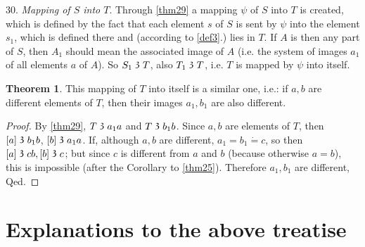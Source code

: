 \documentclass[leqno, hidelinks]{article}
\theoremstyle{definition}
\newtheorem{theorem}{Theorem}
\newcommand\partof{\mathrel{\raisebox{0.45ex}{$\mathfrak{3}$}}}
\begin{document}
30. \emph{Mapping of $S$ into $T$}. Through \ref{thm29} a mapping $\psi$ of $S$ into $T$ is created, which is defined by the fact that each element $s$ of $S$ is sent by $\psi$ into the element $s_1$, which is defined there and (according to \ref{def3}.) lies in $T$.
If $A$ is then any part of $S$, then $A_1$ should mean the associated image of $A$ (i.e. the system of images $a_1$ of all elements $a$ of $A$). So $S_1 \partof T$, also $T_1 \partof T$, i.e. $T$ is mapped by $\psi$ into itself.

\begin{theorem}\label{thm31}
This mapping of $T$ into itself is a similar one, i.e.: if $a, b$ are different elements of $T$, then their images $a_1, b_1$ are also different.
\end{theorem}

\begin{proof}
By \ref{thm29}, $T \partof a_1a$ and $T \partof b_1b$. Since $a, b$ are elements of $T$, then $[a] \partof b_1b$, $[b] \partof a_1a$. If, although $a, b$ are different, $a_1 = b_1  \dot{=}
c$, so then $[a] \partof cb, [b] \partof c$; but since $c$ is different from $a$ and $b$ (because otherwise $a=b$), this is impossible (after the Corollary to \ref{thm25}). Therefore $a_1, b_1$ are different, Qed.
\end{proof}

\section*{Explanations to the above treatise}
\end{document}
